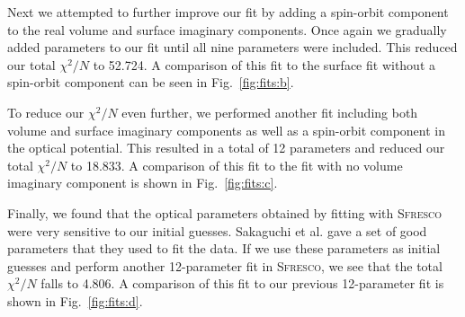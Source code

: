 \documentclass[aps, prc, twocolumn, reprint]{revtex4-1}
\newcommand{\sfresco}[0]{\textsc{Sfresco}\xspace}
\begin{document}
Next we attempted to further improve our fit by adding a spin-orbit component to the real volume and surface imaginary components.  Once again we gradually added parameters to our fit until all nine parameters were included.  This reduced our total $\chi^2/N$ to 52.724.  A comparison of this fit to the surface fit without a spin-orbit component can be seen in Fig.~\ref{fig:fits:b}.

To reduce our $\chi^2/N$ even further, we performed another fit including both volume and surface imaginary components as well as a spin-orbit component in the optical potential.  This resulted in a total of 12 parameters and reduced our total $\chi^2/N$ to 18.833.  A comparison of this fit to the fit with no volume imaginary component is shown in Fig.~\ref{fig:fits:c}.

Finally, we found that the optical parameters obtained by fitting with \sfresco were very sensitive to our initial guesses.  Sakaguchi et al. gave a set of good parameters that they used to fit the data. \cite{Sakaguchi1982}  If we use these parameters as initial guesses and perform another 12-parameter fit in \sfresco, we see that the total $\chi^2/N$ falls to 4.806.  A comparison of this fit to our previous 12-parameter fit is shown in Fig.~\ref{fig:fits:d}.
\end{document}
